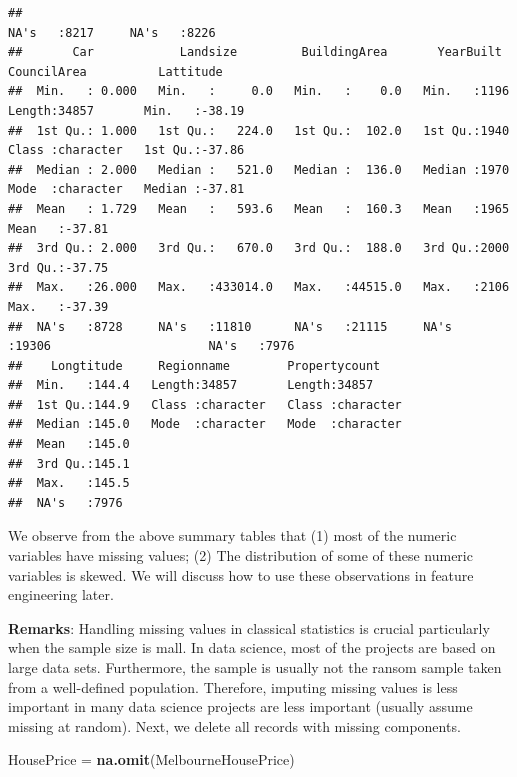 \documentclass[
]{book}
\newenvironment{Shaded}{\begin{snugshade}}{\end{snugshade}}
\newcommand{\FunctionTok}[1]{\textcolor[rgb]{0.13,0.29,0.53}{\textbf{#1}}}
\newcommand{\NormalTok}[1]{#1}
\newcommand{\OtherTok}[1]{\textcolor[rgb]{0.56,0.35,0.01}{#1}}
\begin{document}
\begin{verbatim}
##                                                                              NA's   :8217     NA's   :8226    
##       Car            Landsize         BuildingArea       YearBuilt     CouncilArea          Lattitude     
##  Min.   : 0.000   Min.   :     0.0   Min.   :    0.0   Min.   :1196    Length:34857       Min.   :-38.19  
##  1st Qu.: 1.000   1st Qu.:   224.0   1st Qu.:  102.0   1st Qu.:1940    Class :character   1st Qu.:-37.86  
##  Median : 2.000   Median :   521.0   Median :  136.0   Median :1970    Mode  :character   Median :-37.81  
##  Mean   : 1.729   Mean   :   593.6   Mean   :  160.3   Mean   :1965                       Mean   :-37.81  
##  3rd Qu.: 2.000   3rd Qu.:   670.0   3rd Qu.:  188.0   3rd Qu.:2000                       3rd Qu.:-37.75  
##  Max.   :26.000   Max.   :433014.0   Max.   :44515.0   Max.   :2106                       Max.   :-37.39  
##  NA's   :8728     NA's   :11810      NA's   :21115     NA's   :19306                      NA's   :7976    
##    Longtitude     Regionname        Propertycount     
##  Min.   :144.4   Length:34857       Length:34857      
##  1st Qu.:144.9   Class :character   Class :character  
##  Median :145.0   Mode  :character   Mode  :character  
##  Mean   :145.0                                        
##  3rd Qu.:145.1                                        
##  Max.   :145.5                                        
##  NA's   :7976
\end{verbatim}

We observe from the above summary tables that (1) most of the numeric variables have missing values; (2) The distribution of some of these numeric variables is skewed. We will discuss how to use these observations in feature engineering later.

\textbf{Remarks}: Handling missing values in classical statistics is crucial particularly when the sample size is mall. In data science, most of the projects are based on large data sets. Furthermore, the sample is usually not the ransom sample taken from a well-defined population. Therefore, imputing missing values is less important in many data science projects are less important (usually assume missing at random). Next, we delete all records with missing components.

\begin{Shaded}
\begin{Highlighting}[]
\NormalTok{HousePrice }\OtherTok{=} \FunctionTok{na.omit}\NormalTok{(MelbourneHousePrice)}
\end{Highlighting}
\end{Shaded}
\end{document}
